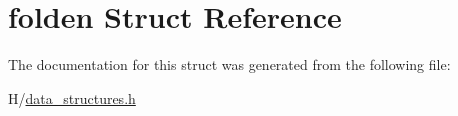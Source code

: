 \hypertarget{structfolden}{
\section{folden Struct Reference}
\label{structfolden}
}


The documentation for this struct was generated from the following file:\begin{DoxyCompactItemize}
\item 
H/\hyperlink{data__structures_8h}{data\_\-structures.h}\end{DoxyCompactItemize}
